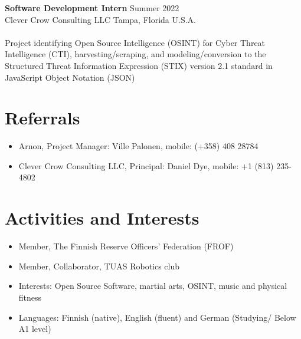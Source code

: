 \documentclass[15pt, letterpaper]{article}
\begin{document}
\textbf{Software Development Intern} \hfill Summer 2022\\
Clever Crow Consulting LLC \hfill Tampa, Florida U.S.A.\\\\
Project identifying Open Source Intelligence (OSINT) for Cyber Threat Intelligence (CTI), harvesting/scraping, and modeling/conversion to the Structured Threat Information Expression (STIX) version 2.1 standard in JavaScript Object Notation (JSON)\\

\section*{Referrals}	
\begin{itemize}[leftmargin=*,noitemsep,topsep=-17pt]
	\item Arnon, Project Manager: Ville Palonen, mobile: (+358) 408 28784
	\item Clever Crow Consulting LLC, Principal: Daniel Dye, mobile: +1 (813) 235-4802
\end{itemize}


\newpage

\section*{Activities and Interests}
\begin{itemize}[leftmargin=*,noitemsep,topsep=-17pt]
	\item Member, The Finnish Reserve Officers’ Federation (FROF)
	\item Member, Collaborator, TUAS Robotics club
	\item Interests: Open Source Software, martial arts, OSINT, music and physical fitness
	\item Languages: Finnish (native), English (fluent) and German (Studying/ Below A1 level)
\end{itemize}
\end{document}
